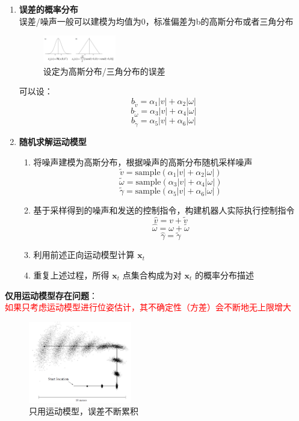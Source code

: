 \documentclass[../main.tex]{subfiles}
\begin{document}
\begin{enumerate}
\begin{enumerate}
        \item \textbf{误差的概率分布}\\
         误差/噪声一般可以建模为均值为0，标准偏差为b的高斯分布或者三角分布
            \begin{figure}[H]
                \centering
                \includegraphics[width=0.3\textwidth]{images/error2.png}
                \caption{设定为高斯分布/三角分布的误差}
            \end{figure}
            可以设：
            $$b_{\widetilde{v}} = \alpha_{1}|v| + \alpha_{2}|\omega|$$
            $$ b_{\widetilde{\omega}} = \alpha_{3}|v| + \alpha_{4}|\omega|$$
            $$b_{\widetilde{\gamma}} = \alpha_{5}|v| + \alpha_{6}|\omega|$$
            
        \item \textbf{随机求解运动模型}
        \begin{enumerate}
            \item 将噪声建模为高斯分布，根据噪声的高斯分布随机采样噪声
            $$\widetilde{v} = \mathrm{sample}(\alpha_1 |v| + \alpha_2 |\omega|)$$
            $$\widetilde{\omega} = \mathrm{sample}(\alpha_3 |v| + \alpha_4 |\omega|)$$
            $$\widetilde{\gamma} = \mathrm{sample}(\alpha_5 |v| + \alpha_6 |\omega|)$$
            \item 基于采样得到的噪声和发送的控制指令，构建机器人实际执行控制指令
            $$\widehat{v} = v + \widetilde{v}$$
            $$\widehat{\omega} = \omega + \widetilde{\omega}$$
            $$\widehat{\gamma} = \widetilde{\gamma}$$
            \item 利用前述正向运动模型计算 $\mathbf{x}_t$
            \item 重复上述过程，所得 $\mathbf{x}_t$ 点集合构成为对 $\mathbf{x}_t$ 的概率分布描述
        \end{enumerate}
\end{enumerate}
\end{enumerate}

        
\vspace{2em}
\textbf{仅用运动模型存在问题}：\\
\textcolor{red}{如果只考虑运动模型进行位姿估计，其不确定性（方差）会不断地无上限增大}
                \begin{figure}[H]
                    \centering
                    \includegraphics[width=0.4\textwidth]{images/unsure.png}
                    \caption{只用运动模型，误差不断累积}
                \end{figure}
\end{document}
